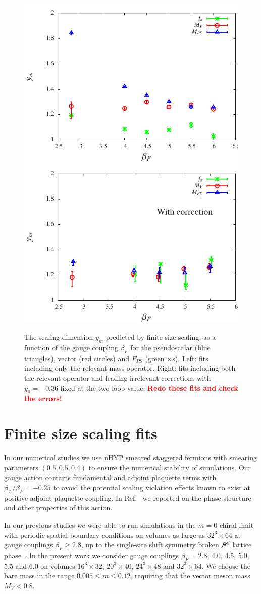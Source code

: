 \documentclass[prl, letterpaper, amsmath, amssymb, preprintnumbers, showpacs, superscriptaddress, twocolumn]{revtex4-1}
\newcommand{\be}{\ensuremath{\beta} }
\newcommand{\X}{\ensuremath{\!\times\!} }
\newcommand{\Sb}{\ensuremath{\cancel{S^4}} }
\newcommand{\refcite}[1]{Ref.~\cite{#1}}
\newcommand{\TODO}[1]{\textcolor{red}{{\bf #1}}}
\begin{document}
\begin{figure}[tbp]
  \includegraphics[width=0.45\linewidth]{ym_c0}\hfill
  \includegraphics[width=0.45\linewidth]{ym}
  \caption{\label{fig:scaling_exp} The scaling dimension $y_m$ predicted by finite size scaling, as a function of the gauge coupling $\beta_F$ for the pseudoscalar (blue triangles), vector (red circles) and $F_{PS}$ (green $\times$s).  Left: fits including only the relevant mass operator.  Right: fits including both the relevant operator and leading irrelevant corrections with $y_0=-0.36$ fixed at the two-loop value.  \TODO{Redo these fits and check the errors!}}
\end{figure}



\section{Finite size scaling fits} %
In our numerical studies we use nHYP smeared staggered fermions with smearing parameters $(0.5, 0.5, 0.4)$ to ensure the numerical stability of simulations.
Our gauge action contains fundamental and adjoint plaquette terms with $\be_A / \be_F = -0.25$ to avoid the potential scaling violation effects known to exist at positive adjoint plaquette coupling.
In \refcite{Cheng:2011ic} we reported on the phase structure and other properties of this action.

In our previous studies we were able to run simulations in the $m = 0$ chiral limit with periodic spatial boundary conditions on volumes as large as $32^3\X64$ at gauge couplings $\be_F \ge 2.8$, up to the single-site shift symmetry broken \Sb lattice phase~\cite{Hasenfratz:2013uha}.
In the present work we consider gauge couplings $\be_F = 2.8$, 4.0, 4.5, 5.0, 5.5 and 6.0 on volumes $16^3\X32$, $20^3\X40$, $24^3\X48$ and $32^3\X64$.
We choose the bare mass in the range $0.005 \leq m \leq 0.12$, requiring that the vector meson mass $M_V < 0.8$.
\end{document}

